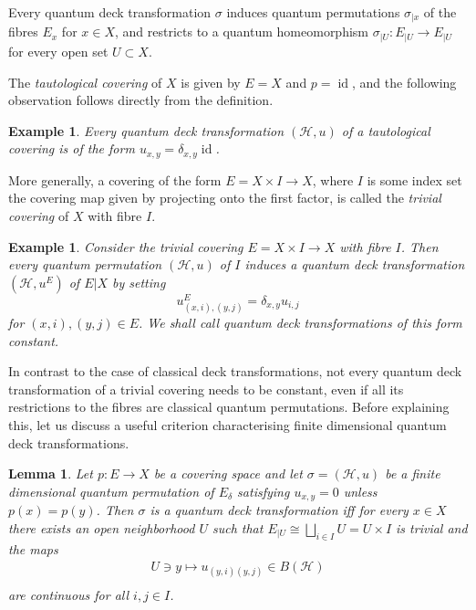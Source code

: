 \documentclass[a4paper]{amsart}
\newcommand*{\Hc}{\mathcal{H}}
\DeclareMathOperator{\id}{id}
\numberwithin{equation}{section}
\theoremstyle{change}
\newtheorem{lemma}[theorem]{Lemma}
\newtheorem{example}[theorem]{Example}
\begin{document}
Every quantum deck transformation $ \sigma $ induces quantum permutations $ \sigma_{|x} $ of the fibres $ E_x $ for $ x \in X $, and  
restricts to a quantum homeomorphism $ \sigma_{|U}: E_{|U} \rightarrow E_{|U} $ for every open set $ U \subset X $. 

The \emph{tautological covering} of $ X $ is given by $ E = X $ and $ p = \id $, and the following observation follows directly from the definition. 

\begin{example} \label{trivialcovering}
Every quantum deck transformation $ (\Hc, u) $ of a tautological covering is of the form $ u_{x,y} = \delta_{x,y} \id $. 
\end{example} 

More generally, a covering of the form $ E = X \times I \rightarrow X $, where $ I $ is some index set the covering map given by projecting onto the first factor, is called the \emph{trivial covering} of $ X $ with fibre $ I $. 

\begin{example} \label{exconstant}
Consider the trivial covering $ E = X \times I \rightarrow X $ with fibre $ I $. Then every quantum permutation $ (\Hc, u) $ of $ I $ induces a quantum deck transformation $ (\Hc, u^E) $ of $ E|X $ by setting 
$$
u^E_{(x, i), (y,j)} = \delta_{x,y} u_{i,j}
$$
for $ (x,i), (y,j) \in E $. We shall call quantum deck transformations of this form constant.
\end{example}

In contrast to the case of classical deck transformations, not every quantum deck transformation of a trivial covering needs to be constant, even if all its restrictions to the fibres are classical quantum permutations. Before explaining this, let us discuss a useful criterion characterising finite dimensional quantum deck transformations. 

\begin{lemma} \label{checkingquantumdeck}
Let $ p: E \rightarrow X $ be a covering space and let $ \sigma = (\Hc, u) $ be a finite dimensional quantum permutation of $ E_\delta $ satisfying $ u_{x, y} = 0 $ unless $ p(x) = p(y) $. 
Then  $ \sigma $ is a quantum deck transformation iff for every $ x \in X $ there exists an open neighborhood $ U $ 
such that $ E_{|U} \cong \bigsqcup_{i \in I} U = U \times I $ is trivial and the maps 
\begin{align*}
U \ni y \mapsto u_{(y,i)(y,j)} \in B(\Hc) \\
\end{align*}
are continuous for all $ i,j \in I $. 
\end{lemma} 
\end{document}
